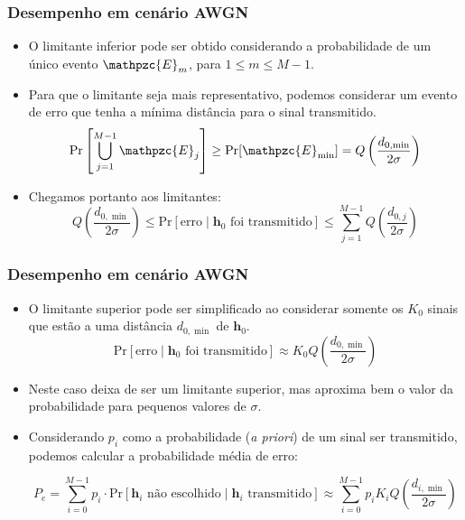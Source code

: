 \begin{frame}
	\frametitle{Desempenho em cenário AWGN}

	\begin{itemize}
	    \item O limitante inferior pode ser obtido considerando a probabilidade de um único evento $\mathpzc{E}_m$, para $1\leq m \leq M-1$.
	    \item Para que o limitante seja mais representativo, podemos considerar um evento de erro que tenha a mínima distância para o sinal transmitido.
	    \begin{equation*}
		 \mathrm{Pr}\left[ \bigcup_{j=1}^{M-1} \mathpzc{E}_j \right] \geq \mathrm{Pr}[\mathpzc{E}_{\min}] = Q\left(\frac{d_{0,\min}}{2\sigma} \right)
	    \end{equation*}
	    \item Chegamos portanto aos limitantes:
	    \begin{equation*}
		Q\left(\frac{d_{0,\min}}{2\sigma}\right) \leq \mathrm{Pr}[\text{erro} \mid \mathbf{h}_0 \text{ foi transmitido}] \leq  \sum_{j=1}^{M-1} Q\left(\frac{d_{0,j}}{2\sigma}\right)
	    \end{equation*}    
	\end{itemize}
\end{frame}

\begin{frame}
	\frametitle{Desempenho em cenário AWGN}

	\begin{itemize}
	    \item O limitante superior pode ser simplificado ao considerar somente os $K_0$ sinais que estão a uma distância $d_{0,\min}$ de $\mathbf{h}_0$.
	    \begin{equation*}
		\mathrm{Pr}[\text{erro} \mid \mathbf{h}_0 \text{ foi transmitido}] \approx K_0 Q\left(\frac{d_{0,\min}}{2\sigma}\right)
	    \end{equation*}
	    \item Neste caso deixa de ser um limitante superior, mas aproxima bem o valor da probabilidade para pequenos valores de $\sigma$.
	    \item Considerando $p_i$ como a probabilidade (\textit{a priori}) de um sinal ser transmitido, podemos calcular a probabilidade média de erro:
	    \begin{small}
	    \begin{equation*}
		P_e = \sum_{i=0}^{M-1} p_i \cdot \mathrm{Pr}[\mathbf{h}_i \text{ não escolhido} \mid \mathbf{h}_i \text{ transmitido}] \approx \sum_{i=0}^{M-1} p_i K_i Q\left(\frac{d_{i,\min}}{2\sigma}\right)
	    \end{equation*}
	    \end{small}
	\end{itemize}
\end{frame}

